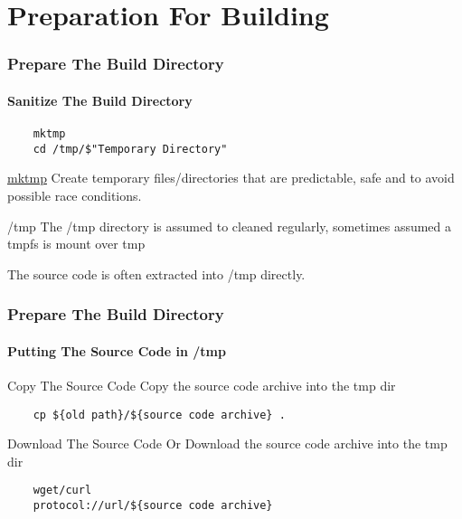 \documentclass[12pt,hyperref={pdfpagelabels=true}]{beamer}
\begin{document}
\section{Preparation For Building}

\begin{frame}[fragile]
  \frametitle{Prepare The Build Directory}
  \framesubtitle{Sanitize The Build Directory}
  \lstset{language=sh}
  \begin{lstlisting}
    mktmp
    cd /tmp/$"Temporary Directory"
  \end{lstlisting}
  
  \pause
  
  \begin{alertblock}{\href{http://unixhelp.ed.ac.uk/CGI/man-cgi?mktemp}{mktmp}}
    Create temporary files/directories that are predictable, safe and to avoid
    possible race conditions.
  \end{alertblock}
  
  \pause

  \begin{alertblock}{/tmp}
    The /tmp directory is assumed to cleaned regularly, sometimes assumed a
    tmpfs is mount over tmp
    
    The source code is often extracted into /tmp directly.
  \end{alertblock}
\end{frame}

\begin{frame}[fragile]
  \frametitle{Prepare The Build Directory}
  \framesubtitle{Putting The Source Code in /tmp}
  \begin{block}{Copy The Source Code}
    Copy the source code archive into the tmp dir
  \end{block}
  
  \pause
  
  \begin{lstlisting}
    cp ${old path}/${source code archive} .
  \end{lstlisting}
  
  \pause
  
  \begin{block}{Download The Source Code}
    Or Download the source code archive into the tmp dir
  \end{block}
  
  \pause
  
  \begin{lstlisting}
    wget/curl
    protocol://url/${source code archive}
  \end{lstlisting}
\end{frame}
\end{document}
